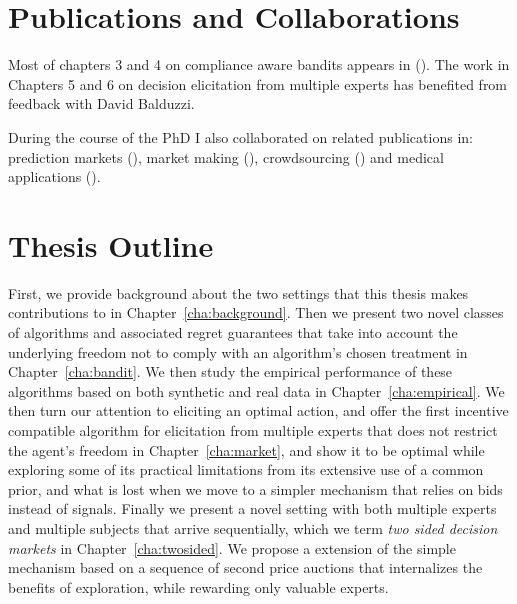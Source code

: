 \section{Publications and Collaborations}

Most of chapters 3 and 4 on compliance aware bandits appears in (\cite{della2016compliance}). The work in Chapters 5 and 6 on decision elicitation from multiple experts has benefited from feedback with David Balduzzi.

During the course of the PhD I also collaborated on related publications in: prediction markets (\cite{frongillo2012interpreting}), market making (\cite{kinathil2014closed,kinathil2016symbolic}), crowdsourcing (\cite{della2012crowd}) and medical applications (\cite{della2016out}).


\section{Thesis Outline}
\label{sec:outline}

First, we provide background about the two settings that this thesis makes contributions to in  Chapter~\ref{cha:background}. Then we present two novel classes of algorithms and associated regret guarantees that take into account the underlying freedom not to comply with an algorithm's chosen treatment in Chapter~\ref{cha:bandit}. We then study the empirical performance  of these algorithms based on both synthetic and real data in Chapter~\ref{cha:empirical}.
We then turn our attention to eliciting an optimal action, and offer the first incentive compatible algorithm for elicitation from multiple experts that does not restrict the agent's freedom in Chapter~\ref{cha:market}, and show it to be optimal while exploring some of its practical limitations from its extensive use of a common prior, and what is lost when we move to a simpler mechanism that relies on bids instead of signals.
Finally we present a novel setting with both multiple experts and multiple subjects that arrive sequentially, which we term \emph{two sided decision markets} in Chapter~\ref{cha:twosided}. We propose a extension of the simple mechanism based on a sequence of second price auctions that internalizes the benefits of exploration, while rewarding only valuable experts.

